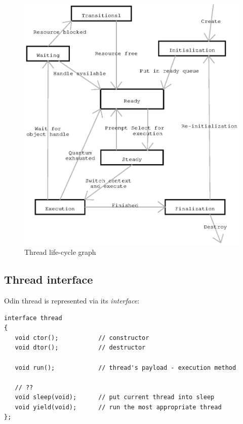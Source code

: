 \documentclass[onecolumn]{article}
\begin{document}
\begin{center}
\begin{figure}[ht]
\includegraphics{process_life_cycle.eps}
\caption{Thread life-cycle graph}
\label{fig:life-cycle}
\end{figure}
\end{center}


\subsection{Thread interface}
\label{sec-thread-interface}

\par Odin thread is represented via its \emph{interface}:

\small
\begin{verbatim}
interface thread
{
   void ctor();           // constructor
   void dtor();           // destructor

   void run();            // thread's payload - execution method

   // ??
   void sleep(void);      // put current thread into sleep
   void yield(void);      // run the most appropriate thread
};
\end{verbatim}
\normalsize
\end{document}
